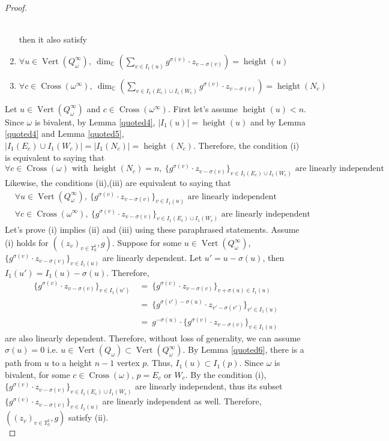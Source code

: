 \begin{proof}
\begin{enumerate}[label = (\roman*)]
\\
then it also satisfy\\
\item $\forall u\in \operatorname{Vert}(Q_\omega^\infty),~\operatorname{dim}_\mathbb{C}(\sum_{v\in I_1(u)} g^{\sigma(v)}\cdot z_{v-\sigma(v)}) = \operatorname{height}(u)$
\item $\forall c\in \operatorname{Cross}(\omega^\infty),~\operatorname{dim}_\mathbb{C}(\sum_{v\in I_1(E_c)\cup I_1(W_c)} g^{\sigma(v)}\cdot z_{v-\sigma(v)}) = \operatorname{height}(N_c)$
\end{enumerate}
Let $u\in \operatorname{Vert}(Q_\omega^\infty)$ and $c\in \operatorname{Cross}(\omega^\infty)$. First let's assume $\operatorname{height}(u)<n$. Since $\omega$ is bivalent, by Lemma \ref{quoted4}, $|I_1(u)|=\operatorname{height}(u)$ and by Lemma \ref{quoted4} and Lemma \ref{quoted5}, $|I_1(E_c)\cup I_1(W_c)| = |I_1(N_c)| = \operatorname{height}(N_c)$. Therefore, the condition (\Rn{1}) is equivalent to saying that 
\[
\forall c\in \operatorname{Cross}(\omega) \text{ with } \operatorname{height}(N_c) = n, ~\{g^{\sigma(v)}\cdot z_{v-\sigma(v)}\}_{v\in I_1(E_c)\cup I_1(W_c)}
\text{ are linearly independent}\] 
Likewise, the conditions (\Rn{2}),(\Rn{3}) are equivalent to saying that 
\begin{align*}
&\forall u\in \operatorname{Vert}(Q_\omega^\infty), ~\{g^{\sigma(v)}\cdot z_{v-\sigma(v)}\}_{v\in I_1(u)} \text{ are linearly independent} \\
&\forall c\in \operatorname{Cross}(\omega^\infty), ~\{g^{\sigma(v)}\cdot z_{v-\sigma(v)}\}_{v\in I_1(E_c)\cup I_1(W_c)}\text{ are linearly independent}
\end{align*}
Let's prove (\Rn{1}) implies (\Rn{2}) and (\Rn{3}) using these paraphrased statements. Assume (\Rn{1}) holds for $((z_v)_{v\in \Upsilon_0^1},g)$. Suppose for some $u\in \operatorname{Vert}(Q_\omega^\infty)$, $\{g^{\sigma(v)}\cdot z_{v-\sigma(v)}\}_{v\in I_1(u)}$ are linearly dependent. Let $u' = u-\sigma(u)$, then $I_1(u')=I_1(u)-\sigma(u)$. Therefore, 
\begin{align*}
\{g^{\sigma(v)}\cdot z_{v-\sigma(v)}\}_{v\in I_1(u')}~&=~\{g^{\sigma(v)}\cdot z_{v-\sigma(v)}\}_{v+\sigma(u)\in I_1(u)}\\
&=~\{g^{\sigma(v')-\sigma(u)}\cdot z_{v'-\sigma(v')}\}_{v'\in I_1(u)} \\
&=~g^{-\sigma(u)}\cdot\{g^{\sigma(v)}\cdot z_{v-\sigma(v)}\}_{v\in I_1(u)}
\end{align*}
are also linearly dependent. Therefore, without loss of generality, we can assume $\sigma(u) = 0$ i.e. $u\in \operatorname{Vert}(Q_\omega)\subset \operatorname{Vert}(Q_\omega^\infty)$. By Lemma \ref{quoted6}, there is a path from $u$ to a height $n-1$ vertex $p$. Thus, $I_1(u)\subset I_1(p)$. Since $\omega$ is bivalent, for some $c\in \operatorname{Cross}(\omega)$, $p=E_c\text{ or }W_c$. By the condition (\Rn{1}), $\{g^{\sigma(v)}\cdot z_{v-\sigma(v)}\}_{v\in I_1(E_c)\cup I_1(W_c)}$ are linearly independent, thus its subset $\{g^{\sigma(v)}\cdot z_{v-\sigma(v)}\}_{v\in I_1(u)}$ are linearly independent as well. Therefore, $((z_v)_{v\in\Upsilon_0^1},g)$ satisfy (\Rn{2}).\\

\end{proof}
